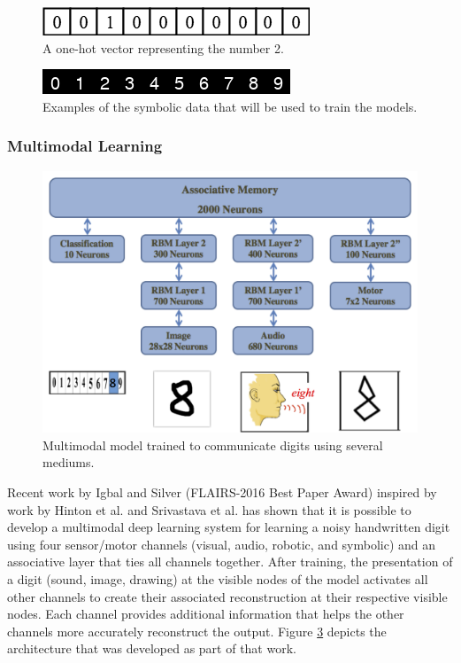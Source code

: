 \documentclass{article}
\begin{document}
	\begin{figure}
		\centering
		\includegraphics[max width=\textwidth]{one-hot-vector}
		\caption{A one-hot vector representing the number 2.}
		\label{fig:one-hot-vector}
	\end{figure}
	
	\begin{figure}
		\centering
		\includegraphics[max width=\textwidth]{symbols}
		\caption{Examples of the symbolic data that will be used to train the models.}
		\label{fig:symbols}
	\end{figure}
	
	\subsubsection{Multimodal Learning}
	
	\begin{figure}
		\centering
		\includegraphics[max width=\textwidth]{multimodal-learning}
		\caption{Multimodal model trained to communicate digits using several mediums.}
		\label{fig:multimodal-learning}
	\end{figure}
	
	Recent work by Igbal and Silver (FLAIRS-2016 Best Paper Award)\cite{iqbal2016scalable} inspired by work by Hinton et al.\cite{Hinton:2006:FLA:1161603.1161605} and Srivastava et al.\cite{JMLR:v15:srivastava14b} has shown that it is possible to develop a multimodal deep learning system for learning a noisy handwritten digit using four sensor/motor channels (visual, audio, robotic, and symbolic) and an associative layer that ties all channels together.  After training, the presentation of a digit (sound, image, drawing) at the visible nodes of the model activates all other channels to create their associated reconstruction at their respective visible nodes. Each channel provides additional information that helps the other channels more accurately reconstruct the output. Figure \ref{fig:multimodal-learning} depicts the architecture that was developed as part of that work.
	
\end{document}
